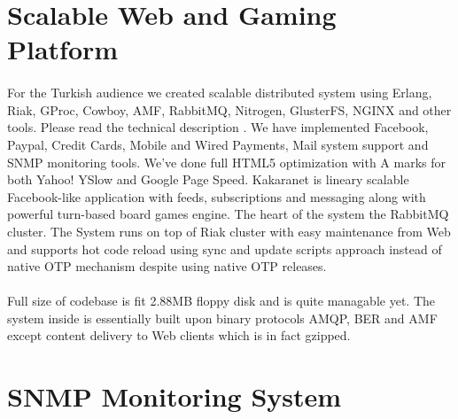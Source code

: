 \documentclass[11pt]{article}
\begin{document}
\section*{Scalable Web and Gaming Platform}
\paragraph{}
    For the Turkish audience we created scalable distributed system using Erlang, Riak,
    GProc, Cowboy, AMF, RabbitMQ, Nitrogen, GlusterFS, NGINX and other tools. 
    Please read the technical description
    .
    We have implemented Facebook, Paypal, Credit Cards, Mobile and Wired Payments,
    Mail system support and SNMP monitoring tools. We've done full HTML5 optimization
    with A marks for both Yahoo! YSlow and Google Page Speed. Kakaranet is lineary scalable
    Facebook-like application with feeds, subscriptions and messaging along with
    powerful turn-based board games engine. The heart of the system the RabbitMQ
    cluster. The System runs on top of Riak cluster with easy maintenance from Web
    and supports hot code reload using sync and update scripts approach 
    instead of native OTP mechanism despite using native OTP releases. 



\paragraph{}
    Full size of codebase is fit 2.88MB floppy disk and is quite managable yet.
    The system inside is essentially built upon binary protocols AMQP, BER and AMF
    except content delivery to Web clients which is in fact gzipped.



\section*{SNMP Monitoring System}
\end{document}
